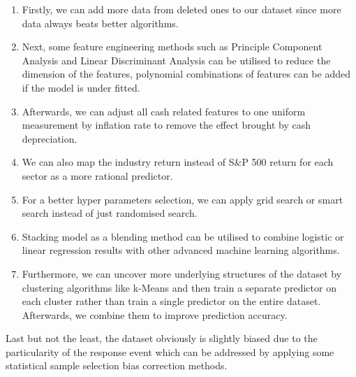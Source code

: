 \begin{enumerate}
   \item Firstly, we can add more data from deleted ones to our dataset since more data always beats better algorithms.
   \item Next, some feature engineering methods such as Principle Component Analysis and Linear Discriminant Analysis can be utilised to reduce the dimension of the features, polynomial combinations of features can be added if the model is under fitted. 
   \item Afterwards, we can adjust all cash related features to one uniform measurement by inflation rate to remove the effect brought by cash depreciation. 
\item We can also map the industry return instead of S\&P 500 return for each sector as a more rational predictor. 
   \item For a better hyper parameters selection, we can apply grid search or smart search instead of just randomised search.
   \item Stacking model as a blending method can be utilised to combine logistic or linear regression results with other advanced machine learning algorithms. 
   \item Furthermore, we can uncover more underlying structures of the dataset by clustering algorithms like k-Means and then train a separate predictor on each cluster rather than train a single predictor on the entire dataset. Afterwards, we combine them to improve prediction accuracy. 
\end{enumerate}
Last but not the least, the dataset obviously is slightly biased due to the particularity of the response event which can be addressed by applying some statistical sample selection bias correction methods. 